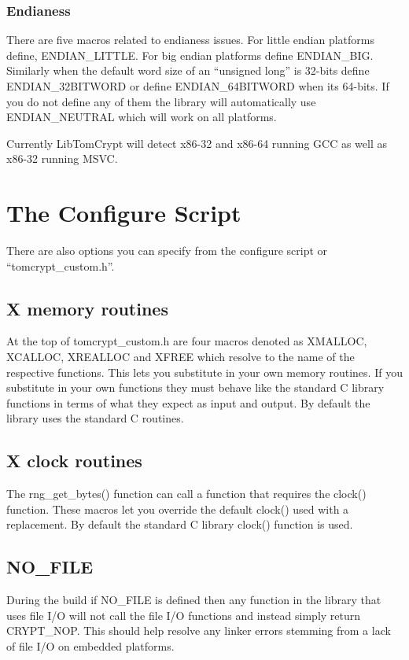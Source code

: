 \documentclass[a4paper]{book}
\begin{document}
\subsubsection{Endianess}
There are five macros related to endianess issues.  For little endian platforms define, ENDIAN\_LITTLE.  For big endian
platforms define ENDIAN\_BIG.  Similarly when the default word size of an ``unsigned long'' is 32-bits define ENDIAN\_32BITWORD
or define ENDIAN\_64BITWORD when its 64-bits.  If you do not define any of them the library will automatically use ENDIAN\_NEUTRAL
which will work on all platforms.

Currently LibTomCrypt will detect x86-32 and x86-64 running GCC as well as x86-32 running MSVC.  

\section{The Configure Script}
There are also options you can specify from the configure script or ``tomcrypt\_custom.h''.  

\subsection{X memory routines}
At the top of tomcrypt\_custom.h are four macros denoted as XMALLOC, XCALLOC, XREALLOC and XFREE which resolve to 
the name of the respective functions.  This lets you substitute in your own memory routines.  If you substitute in 
your own functions they must behave like the standard C library functions in terms of what they expect as input and 
output.  By default the library uses the standard C routines.

\subsection{X clock routines}
The rng\_get\_bytes() function can call a function that requires the clock() function.  These macros let you override
the default clock() used with a replacement.  By default the standard C library clock() function is used.

\subsection{NO\_FILE}
During the build if NO\_FILE is defined then any function in the library that uses file I/O will not call the file I/O 
functions and instead simply return CRYPT\_NOP.  This should help resolve any linker errors stemming from a lack of
file I/O on embedded platforms.
\end{document}
